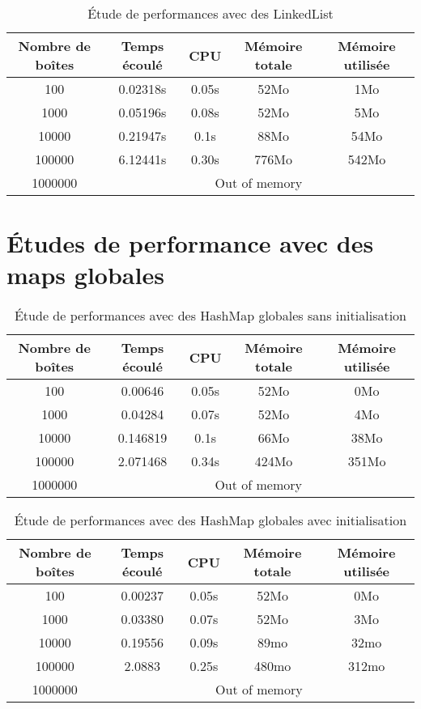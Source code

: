 \begin{table}[htbp]
  \centering
\begin{tabular}{|c|c|c|c|c|}
\hline
Nombre de boîtes & Temps écoulé & CPU & Mémoire totale & Mémoire utilisée\\
\hline
100 & 0.02318s & 0.05s & 52Mo & 1Mo\\
\hline
1000 & 0.05196s & 0.08s & 52Mo & 5Mo\\
\hline
10000 & 0.21947s & 0.1s & 88Mo & 54Mo\\
\hline
100000 & 6.12441s & 0.30s & 776Mo & 542Mo\\
\hline
1000000 & \multicolumn{4}{|c|}{Out of memory}\\
\hline
\end{tabular}
\caption{Étude de performances avec des LinkedList}
\label{tab:linkedlist}
\end{table}
\clearpage




\section{Études de performance avec des maps globales}
\begin{table}[h]
  \centering
\begin{tabular}{|c|c|c|c|c|}
\hline
Nombre de boîtes & Temps écoulé & CPU & Mémoire totale & Mémoire utilisée\\
\hline
100 & 0.00646& 0.05s & 52Mo & 0Mo\\
\hline
1000 & 0.04284 & 0.07s & 52Mo & 4Mo\\
\hline
10000 & 0.146819 & 0.1s & 66Mo & 38Mo\\
\hline
100000 &2.071468 & 0.34s & 424Mo & 351Mo\\
\hline
1000000 & \multicolumn{4}{|c|}{Out of memory}\\
\hline
\end{tabular}
\caption{Étude de performances avec des HashMap globales sans initialisation} 
\label{tab:hashmapglobal}
\end{table}


\begin{table}[h]
  \centering
\begin{tabular}{|c|c|c|c|c|}
\hline
Nombre de boîtes & Temps écoulé & CPU & Mémoire totale & Mémoire utilisée\\
\hline
100 & 0.00237& 0.05s & 52Mo & 0Mo\\
\hline
1000 & 0.03380 & 0.07s & 52Mo & 3Mo\\
\hline
10000 & 0.19556 & 0.09s & 89mo & 32mo\\
\hline
100000 & 2.0883 & 0.25s & 480mo & 312mo\\
\hline
1000000 & \multicolumn{4}{|c|}{Out of memory}\\
\hline
\end{tabular}
\caption{Étude de performances avec des HashMap globales avec initialisation}
\label{tab:hashmapglobalInit}
\end{table}









